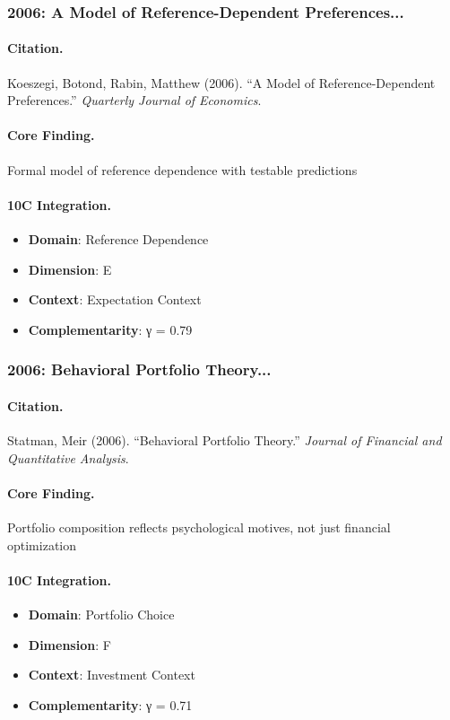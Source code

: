 \subsubsection{2006: A Model of Reference-Dependent Preferences...}

\paragraph{Citation.}
Koeszegi, Botond, Rabin, Matthew (2006). ``A Model of Reference-Dependent Preferences.''
\textit{Quarterly Journal of Economics}.

\paragraph{Core Finding.}
Formal model of reference dependence with testable predictions

\paragraph{10C Integration.}
\begin{itemize}[nosep]
  \item \textbf{Domain}: Reference Dependence
  \item \textbf{Dimension}: E
  \item \textbf{Context}: Expectation Context
  \item \textbf{Complementarity}: γ = 0.79
\end{itemize}

\subsubsection{2006: Behavioral Portfolio Theory...}

\paragraph{Citation.}
Statman, Meir (2006). ``Behavioral Portfolio Theory.''
\textit{Journal of Financial and Quantitative Analysis}.

\paragraph{Core Finding.}
Portfolio composition reflects psychological motives, not just financial optimization

\paragraph{10C Integration.}
\begin{itemize}[nosep]
  \item \textbf{Domain}: Portfolio Choice
  \item \textbf{Dimension}: F
  \item \textbf{Context}: Investment Context
  \item \textbf{Complementarity}: γ = 0.71
\end{itemize}

